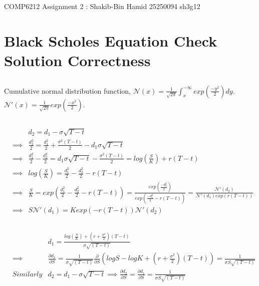 \documentclass[11pt, fleqn]{article}
\begin{document}
\begin{center}

\Large{COMP6212 Assignment 2 : Shakib-Bin Hamid 25250094 sh3g12}

\end{center}

\section{Black Scholes Equation Check Solution Correctness}

\subsection{}
Cumulative normal distribution function, $\mathcal{N}(x) = \frac{1}{\sqrt{2\pi}} \int_x^{-\infty} exp(\frac{-y^2}{2})dy$. $\mathcal{N}'(x) = \frac{1}{\sqrt{2\pi}}exp(\frac{-x^2}{2})$.

\subsection{}
\vspace{-1cm}
\begin{eqnarray*}
&& d_2 = d_1 - \sigma\sqrt{T-t}\\
&\implies& \frac{d_2^2}{2} = \frac{d_1^2}{2} + \frac{\sigma^2(T-t)}{2} - d_1\sigma\sqrt{T-t}\\
&\implies& \frac{d_1^2}{2} - \frac{d_2^2}{2} = d_1\sigma\sqrt{T-t} - \frac{\sigma^2(T-t)}{2} = log(\frac{S}{K}) + r(T-t)\\
&\implies& log(\frac{S}{K}) = \frac{d_1^2}{2} - \frac{d_2^2}{2} - r(T-t)\\
&\implies& \frac{S}{K} = exp(\frac{d_1^2}{2} - \frac{d_2^2}{2} - r(T-t)) = \frac{exp(\frac{-d_2^2}{2})}{exp(\frac{-d_1^2}{2} - r(T-t))} = \frac{\mathcal{N}'(d_2)}{\mathcal{N}'(d_1)exp(r(T-t))}\\
&\implies& S\mathcal{N}'(d_1) = Kexp(-r(T-t))\mathcal{N}'(d_2) 
\end{eqnarray*}

\subsection{}
\vspace{-1cm}
\begin{eqnarray*}
&& d_1 = \frac{log(\frac{S}{K})+(r+\frac{\sigma^2}{2})(T-t)}{\sigma\sqrt{(T-t)}} \\
&\implies& \frac{\partial d_1}{\partial S} = \frac{1}{\sigma\sqrt{(T-t)}} \frac{\partial}{\partial S}(logS - logK + (r+\frac{\sigma^2}{2})(T-t)) = \frac{1}{\sigma S \sqrt{(T-t)}}\\
&Similarly& d_2 = d_1 - \sigma\sqrt{T-t} \implies \frac{\partial d_2}{\partial S} = \frac{\partial d_1}{\partial S}= \frac{1}{\sigma S \sqrt{(T-t)}}
\end{eqnarray*}
\end{document}
